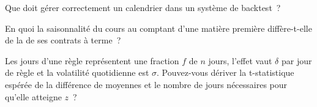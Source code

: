\begin{interviewq}\label{iq:s1:seasonality-and-calendar-effects:4}
Que doit gérer correctement un calendrier dans un système de backtest~?
\end{interviewq}

\begin{interviewq}\label{iq:s1:seasonality-and-calendar-effects:5}
En quoi la saisonnalité du cours au comptant d'une matière première diffère-t-elle de la  de ses contrats à terme~?
\end{interviewq}

\begin{interviewq}\label{iq:s1:seasonality-and-calendar-effects:6}
Les jours d'une règle représentent une fraction $f$ de $n$ jours, l'effet vaut $\delta$ par jour de règle et la volatilité quotidienne est $\sigma$. Pouvez-vous dériver la t-statistique espérée de la
différence de moyennes et le nombre de jours nécessaires pour qu'elle atteigne $z$~?
\end{interviewq}
